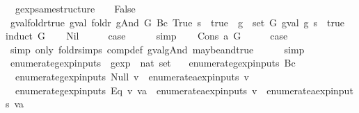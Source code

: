 \begin{isabellebody}
\ \ {\isachardoublequoteopen}gexp{\isacharunderscore}same{\isacharunderscore}structure\ {\isacharunderscore}\ {\isacharunderscore}\ {\isacharequal}\ False{\isachardoublequoteclose}\isanewline
\isanewline
{}\isamarkupfalse%
\ gval{\isacharunderscore}foldr{\isacharunderscore}true{\isacharcolon}\ {\isachardoublequoteopen}{\isacharparenleft}gval\ {\isacharparenleft}foldr\ gAnd\ G\ {\isacharparenleft}Bc\ True{\isacharparenright}{\isacharparenright}\ s\ {\isacharequal}\ true{\isacharparenright}\ {\isacharequal}\ {\isacharparenleft}{\isasymforall}g\ {\isasymin}\ set\ G{\isachardot}\ gval\ g\ s\ {\isacharequal}\ true{\isacharparenright}{\isachardoublequoteclose}\isanewline
%
\isadelimproof
%
\endisadelimproof
%
\isatagproof
{}\isamarkupfalse%
{\isacharparenleft}induct\ G{\isacharparenright}\isanewline
\ \ \isamarkupfalse%
\ Nil\isanewline
\ \ \isamarkupfalse%
\ \isamarkupfalse%
\ {\isacharquery}case\isanewline
\ \ \ \ \isamarkupfalse%
\ simp\isanewline
{}\isamarkupfalse%
\isanewline
\ \ \isamarkupfalse%
\ {\isacharparenleft}Cons\ a\ G{\isacharparenright}\isanewline
\ \ \isamarkupfalse%
\ \isamarkupfalse%
\ {\isacharquery}case\isanewline
\ \ \ \ \isamarkupfalse%
\ {\isacharparenleft}simp\ only{\isacharcolon}\ foldr{\isachardot}simps\ comp{\isacharunderscore}def\ gval{\isacharunderscore}gAnd\ maybe{\isacharunderscore}and{\isacharunderscore}true{\isacharparenright}\isanewline
\ \ \ \ \isamarkupfalse%
\ simp\isanewline
{}\isamarkupfalse%
%
\endisatagproof
{\isafoldproof}%
%
\isadelimproof
\isanewline
%
\endisadelimproof
\isanewline
{}\isamarkupfalse%
\ enumerate{\isacharunderscore}gexp{\isacharunderscore}inputs\ {\isacharcolon}{\isacharcolon}\ {\isachardoublequoteopen}gexp\ {\isasymRightarrow}\ nat\ set{\isachardoublequoteclose}\ \isanewline
\ \ {\isachardoublequoteopen}enumerate{\isacharunderscore}gexp{\isacharunderscore}inputs\ {\isacharparenleft}Bc\ {\isacharunderscore}{\isacharparenright}\ {\isacharequal}\ {\isacharbraceleft}{\isacharbraceright}{\isachardoublequoteclose}\ {\isacharbar}\isanewline
\ \ {\isachardoublequoteopen}enumerate{\isacharunderscore}gexp{\isacharunderscore}inputs\ {\isacharparenleft}Null\ v{\isacharparenright}\ {\isacharequal}\ enumerate{\isacharunderscore}aexp{\isacharunderscore}inputs\ v{\isachardoublequoteclose}\ {\isacharbar}\isanewline
\ \ {\isachardoublequoteopen}enumerate{\isacharunderscore}gexp{\isacharunderscore}inputs\ {\isacharparenleft}Eq\ v\ va{\isacharparenright}\ {\isacharequal}\ enumerate{\isacharunderscore}aexp{\isacharunderscore}inputs\ v\ {\isasymunion}\ enumerate{\isacharunderscore}aexp{\isacharunderscore}inputs\ va{\isachardoublequoteclose}\ {\isacharbar}\isanewline

\end{isabellebody}
